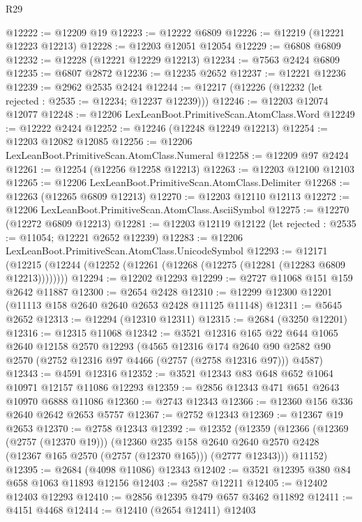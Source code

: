\begin{lexlean}{R29}
\begin{coremodule}
@12222 := @12209 @19
@12223 := @12222 @6809
@12226 := @12219 (@12221 @12223 @12213)
@12228 := @12203 @12051 @12054
@12229 := @6808 @6809
@12232 := @12228 (@12221 @12229 @12213)
@12234 := @7563 @2424 @6809
@12235 := @6807 @2872
@12236 := @12235 @2652
@12237 := @12221 @12236
@12239 := @2962 @2535 @2424
@12244 := @12217 (@12226 (@12232 (let rejected : @2535 := @12234; @12237 @12239)))
@12246 := @12203 @12074 @12077
@12248 := @12206 LexLeanBoot.PrimitiveScan.AtomClass.Word
@12249 := @12222 @2424
@12252 := @12246 (@12248 @12249 @12213)
@12254 := @12203 @12082 @12085
@12256 := @12206 LexLeanBoot.PrimitiveScan.AtomClass.Numeral
@12258 := @12209 @97 @2424
@12261 := @12254 (@12256 @12258 @12213)
@12263 := @12203 @12100 @12103
@12265 := @12206 LexLeanBoot.PrimitiveScan.AtomClass.Delimiter
@12268 := @12263 (@12265 @6809 @12213)
@12270 := @12203 @12110 @12113
@12272 := @12206 LexLeanBoot.PrimitiveScan.AtomClass.AsciiSymbol
@12275 := @12270 (@12272 @6809 @12213)
@12281 := @12203 @12119 @12122 (let rejected : @2535 := @11054; @12221 @2652 @12239)
@12283 := @12206 LexLeanBoot.PrimitiveScan.AtomClass.UnicodeSymbol
@12293 := @12171
    (@12215 (@12244 (@12252 (@12261 (@12268 (@12275 (@12281 (@12283 @6809 @12213))))))))
@12294 := @12202 @12293
@12299 := @2727 @11068 @151 @159 @2642 @11887
@12300 := @2654 @2428
@12310 := @12299 @12300 @12201 (@11113 @158 @2640 @2640 @2653 @2428 @11125 @11148)
@12311 := @5645 @2652
@12313 := @12294 (@12310 @12311)
@12315 := @2684 (@3250 @12201)
@12316 := @12315 @11068
@12342 := @3521
    @12316
    @165
    @22
    @644
    @1065
    @2640
    @12158
    @2570
    @12293
    (@4565
      @12316
      @174
      @2640
      @90
      @2582
      @90
      @2570
      (@2752 @12316 @97 @4466 (@2757 (@2758 @12316 @97)))
      @4587)
@12343 := @4591 @12316
@12352 := @3521 @12343 @83 @648 @652 @1064 @10971 @12157 @11086 @12293
@12359 := @2856 @12343 @471 @651 @2643 @10970 @6888 @11086
@12360 := @2743 @12343
@12366 := @12360 @156 @336 @2640 @2642 @2653 @5757
@12367 := @2752 @12343
@12369 := @12367 @19 @2653
@12370 := @2758 @12343
@12392 := @12352
    (@12359
      (@12366
        (@12369 (@2757 (@12370 @19)))
        (@12360
          @235
          @158
          @2640
          @2640
          @2570
          @2428
          (@12367 @165 @2570 (@2757 (@12370 @165)))
          (@2777 @12343)))
      @11152)
@12395 := @2684 (@4098 @11086) @12343
@12402 := @3521 @12395 @380 @84 @658 @1063 @11893 @12156
@12403 := @2587 @12211
@12405 := @12402 @12403 @12293
@12410 := @2856 @12395 @479 @657 @3462 @11892
@12411 := @4151 @4468
@12414 := @12410 (@2654 @12411) @12403

\end{coremodule}
\end{lexlean}
